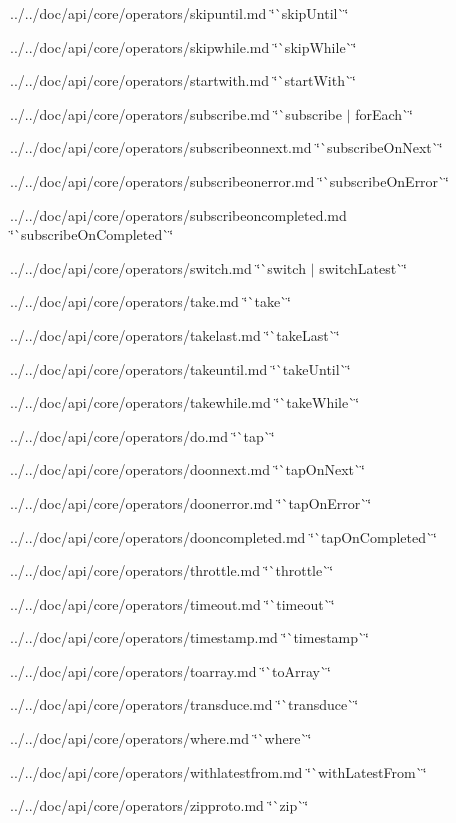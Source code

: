 \begin{DoxyItemize}
\item ../../doc/api/core/operators/skipuntil.md \char`\"{}\`{}skip\+Until\`{}\char`\"{}
\item ../../doc/api/core/operators/skipwhile.md \char`\"{}\`{}skip\+While\`{}\char`\"{}
\item ../../doc/api/core/operators/startwith.md \char`\"{}\`{}start\+With\`{}\char`\"{}
\item ../../doc/api/core/operators/subscribe.md \char`\"{}\`{}subscribe $\vert$ for\+Each\`{}\char`\"{}
\item ../../doc/api/core/operators/subscribeonnext.md \char`\"{}\`{}subscribe\+On\+Next\`{}\char`\"{}
\item ../../doc/api/core/operators/subscribeonerror.md \char`\"{}\`{}subscribe\+On\+Error\`{}\char`\"{}
\item ../../doc/api/core/operators/subscribeoncompleted.md \char`\"{}\`{}subscribe\+On\+Completed\`{}\char`\"{}
\item ../../doc/api/core/operators/switch.md \char`\"{}\`{}switch $\vert$ switch\+Latest\`{}\char`\"{}
\item ../../doc/api/core/operators/take.md \char`\"{}\`{}take\`{}\char`\"{}
\item ../../doc/api/core/operators/takelast.md \char`\"{}\`{}take\+Last\`{}\char`\"{}
\item ../../doc/api/core/operators/takeuntil.md \char`\"{}\`{}take\+Until\`{}\char`\"{}
\item ../../doc/api/core/operators/takewhile.md \char`\"{}\`{}take\+While\`{}\char`\"{}
\item ../../doc/api/core/operators/do.md \char`\"{}\`{}tap\`{}\char`\"{}
\item ../../doc/api/core/operators/doonnext.md \char`\"{}\`{}tap\+On\+Next\`{}\char`\"{}
\item ../../doc/api/core/operators/doonerror.md \char`\"{}\`{}tap\+On\+Error\`{}\char`\"{}
\item ../../doc/api/core/operators/dooncompleted.md \char`\"{}\`{}tap\+On\+Completed\`{}\char`\"{}
\item ../../doc/api/core/operators/throttle.md \char`\"{}\`{}throttle\`{}\char`\"{}
\item ../../doc/api/core/operators/timeout.md \char`\"{}\`{}timeout\`{}\char`\"{}
\item ../../doc/api/core/operators/timestamp.md \char`\"{}\`{}timestamp\`{}\char`\"{}
\item ../../doc/api/core/operators/toarray.md \char`\"{}\`{}to\+Array\`{}\char`\"{}
\item ../../doc/api/core/operators/transduce.md \char`\"{}\`{}transduce\`{}\char`\"{}
\item ../../doc/api/core/operators/where.md \char`\"{}\`{}where\`{}\char`\"{}
\item ../../doc/api/core/operators/withlatestfrom.md \char`\"{}\`{}with\+Latest\+From\`{}\char`\"{}
\item ../../doc/api/core/operators/zipproto.md \char`\"{}\`{}zip\`{}\char`\"{}
\end{DoxyItemize}

